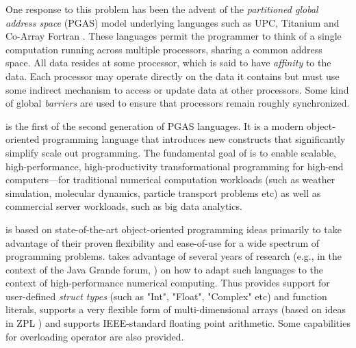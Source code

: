 One response to this problem has been the advent of the {\em
partitioned global address space} (PGAS) model underlying languages
such as UPC, Titanium and Co-Array Fortran \cite{pgas,titanium}. These
languages permit the programmer to think of a single computation
running across multiple processors, sharing a common address
space. All data resides at some processor, which is said to have {\em
affinity} to the data.  Each processor may operate directly on the
data it contains but must use some indirect mechanism to access or
update data at other processors. Some kind of global {\em barriers}
are used to ensure that processors remain roughly synchronized.

\Xten{} is the first of the second generation of PGAS languages. It is
a modern object-oriented programming language that introduces new
constructs that significantly simplify scale out programming.
The fundamental goal of \Xten{} is to enable
scalable, high-performance, high-productivity transformational
programming for high-end computers---for traditional numerical
computation workloads (such as weather simulation, molecular dynamics,
particle transport problems etc) as well as commercial server
workloads, such as big data analytics.

\Xten{} is based on state-of-the-art object-oriented
programming ideas primarily to take advantage of their proven
flexibility and ease-of-use for a wide spectrum of programming
problems. \Xten{} takes advantage of several years of research (e.g.,
in the context of the Java Grande forum,
\cite{moreira00java,kava}) on how to adapt such languages to the context of
high-performance numerical computing. Thus \Xten{} provides support
for user-defined {\em struct types} (such as \xcd"Int", \xcd"Float",
\xcd"Complex" etc) and function literals, supports a very
flexible form of multi-dimensional arrays (based on ideas in ZPL
\cite{zpl}) and supports IEEE-standard floating point arithmetic.
Some capabilities for overloading operator are also provided.

